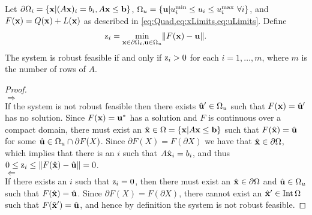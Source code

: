   \medskip
\begin{thm} \label{thm:RobFeas}
  Let $\partial\Omega_i=\{\mathbf{x}| (A\mathbf{x})_i = b_i, A\mathbf{x}\leq \mathbf{b}\}$, $\Omega_{u}=\{\mathbf{u}| u^{\min}_i\leq u_i \leq u^{\max}_i \ \forall i \}$, and $F(\mathbf{x})=Q(\mathbf{x})+L(\mathbf{x})$ as described in \cref{eq:Quad,eq:xLimits,eq:uLimits}.
  Define
  \begin{align}
    \mathrm{z}_i =  \min_{\mathbf{x}\in\partial\Omega_i, \mathbf{u} \in \Omega_u} \lVert F(\mathbf{x})-\mathbf{u}\rVert. \label{eq:OPTfeas}
  \end{align}
  The system is robust feasible if and only if $\mathrm{z}_i>0$ for each $i = 1, \ldots, m$, where $m$ is the number of rows of $A$.

  \begin{proof} \ \\
    $\boxed{\Rightarrow}$ \\ 
    If the system is not robust feasible then there exists $\hat{\mathbf{u}}'\in \Omega_u$ such that $F(\mathbf{x})=\hat{\mathbf{u}}'$ has no solution. 
    Since $F(\mathbf{x})=\mathbf{u}^*$ has a solution and $F$ is continuous over a compact domain, there must exist an $\hat{\mathbf{x}} \in \Omega = \{\mathbf{x}| A\mathbf{x} \leq \mathbf{b}\}$ such that $F(\hat{\mathbf{x}})=\hat{\mathbf{u}}$ for some $\hat{\mathbf{u}}\in \Omega_u\cap \partial F(X)$. 
    Since $\partial F(X) = F(\partial X)$ we have that $\hat{\mathbf{x}}\in\partial\Omega$, which implies that there is an $i$ such that $A\hat{\mathbf{x}}_i=b_i$, and thus $0 \leq \mathrm{z}_i \leq \lVert F(\hat{\mathbf{x}})-\hat{\mathbf{u}}\rVert=0$.\\
    $\boxed{\Leftarrow}$ \\ 
    If there exists an $i$ such that $\mathrm{z}_i = 0$, then there must exist an $\hat{\mathbf{x}} \in \partial\Omega $ and $\hat{\mathbf{u}}\in \Omega_u$ such that $F(\hat{\mathbf{x}})=\hat{\mathbf{u}}$. 
    Since $\partial F(X) = F(\partial X)$, there cannot exist an $\hat{\mathbf{x}}' \in \operatorname{Int}\Omega$ such that $F(\hat{\mathbf{x}}')=\hat{\mathbf{u}}$, and hence by definition the system is not robust feasible.
  \end{proof}
\end{thm}

